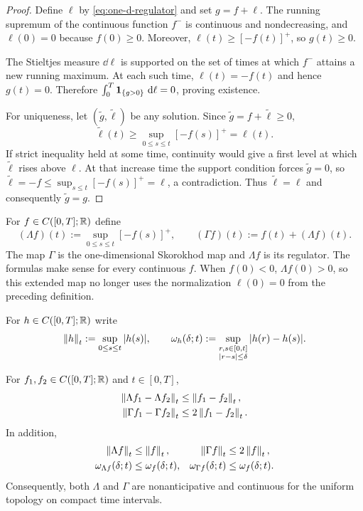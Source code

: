 \begin{proof}
Define $\ell$ by \eqref{eq:one-d-regulator} and set $g=f+\ell$.
The running supremum of the continuous function $f^-$ is continuous and
nondecreasing, and $\ell(0)=0$ because $f(0)\geq0$. Moreover,
$\ell(t)\geq[-f(t)]^+$, so $g(t)\geq0$.

The Stieltjes measure $\dd\ell$ is supported on the set of times at which
$f^-$ attains a new running maximum. At each such time,
$\ell(t)=-f(t)$ and hence $g(t)=0$. Therefore
$\int_0^T\mathbf 1_{\{g>0\}}\,\mathop{}\!\mathrm d\ell=0$, proving existence.

For uniqueness, let $(\widetilde g,\widetilde\ell)$ be any solution. Since
$\widetilde g=f+\widetilde\ell\geq0$,
\[
  \widetilde\ell(t)\geq\sup_{0\leq s\leq t}[-f(s)]^+=\ell(t).
\]
If strict inequality held at some time, continuity would give a first level
at which $\widetilde\ell$ rises above $\ell$. At that increase time the
support condition forces $\widetilde g=0$, so
$\widetilde\ell=-f\leq\sup_{s\leq t}[-f(s)]^+=\ell$, a contradiction.
Thus $\widetilde\ell=\ell$ and consequently $\widetilde g=g$.
\end{proof}

\begin{definition}
For $f\in C([0,T];\mathbb R)$ define
\[
  (\Lambda f)(t):=\sup_{0\leq s\leq t}[-f(s)]^+,
  \qquad
  (\Gamma f)(t):=f(t)+(\Lambda f)(t).
\]
The map $\Gamma$ is the one-dimensional Skorokhod map and $\Lambda f$ is its
regulator. The formulas make sense for every continuous $f$. When $f(0)<0$,
$\Lambda f(0)>0$, so this extended map no longer uses the normalization
$\ell(0)=0$ from the preceding definition.
\end{definition}

For $h\in C([0,T];\mathbb R)$ write
\[
  \left\lVert h\right\rVert_{t}:=\sup_{0\leq s\leq t}|h(s)|,
  \qquad
  \omega_h(\delta;t)
  :=\sup_{\substack{r,s\in[0,t]\\|r-s|\leq\delta}}|h(r)-h(s)|.
\]

\begin{proposition}
For $f_1,f_2\in C([0,T];\mathbb R)$ and $t\in[0,T]$,
\begin{align}
  \left\lVert\Lambda f_1-\Lambda f_2\right\rVert_{t}
    &\leq \left\lVert f_1-f_2\right\rVert_{t}, \label{eq:lambda-lip}\\
  \left\lVert\Gamma f_1-\Gamma f_2\right\rVert_{t}
    &\leq 2\left\lVert f_1-f_2\right\rVert_{t}. \label{eq:gamma-lip}
\end{align}
In addition,
\begin{align}
  \left\lVert\Lambda f\right\rVert_{t}&\leq\left\lVert f\right\rVert_{t},
  &\left\lVert\Gamma f\right\rVert_{t}&\leq2\left\lVert f\right\rVert_{t}, \label{eq:map-growth}\\
  \omega_{\Lambda f}(\delta;t)&\leq\omega_f(\delta;t),
  &\omega_{\Gamma f}(\delta;t)&\leq\omega_f(\delta;t). \label{eq:map-modulus}
\end{align}
Consequently, both $\Lambda$ and $\Gamma$ are nonanticipative and continuous
for the uniform topology on compact time intervals.
\end{proposition}


